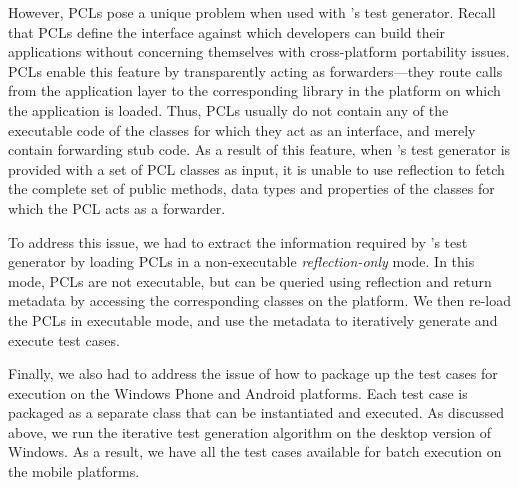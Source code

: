 However, PCLs pose a unique problem when used with \tool's test generator.
Recall that PCLs define the interface against which developers can build their
applications without concerning themselves with cross-platform portability
issues. PCLs enable this feature by transparently acting as forwarders---they
route calls from the application layer to the corresponding library in the
platform on which the application is loaded. Thus, PCLs usually do not contain
any of the executable code of the classes for which they act as an interface,
and merely contain forwarding stub code. As a result of this feature, when
\tool's test generator is provided with a set of PCL classes as input, it is
unable to use reflection to fetch the complete set of public methods, data
types and properties of the classes for which the PCL acts as a forwarder.

To address this issue, we had to extract the information required by \tool's
test generator by loading PCLs in a non-executable \textit{reflection-only}
mode. In this mode, PCLs are not executable, but can be queried using
reflection and return metadata by accessing the corresponding classes on the
platform. We then re-load the PCLs in executable mode, and use the metadata to
iteratively generate and execute test cases.

%
Finally, we also had to address the issue of how to package up the test cases
for execution on the Windows Phone and Android platforms. Each test case is
packaged as a separate class that can be instantiated and executed. As
discussed above, we run the iterative test generation algorithm on the desktop
version of Windows. As a result, we have all the test cases available for batch
execution on the mobile platforms. 

